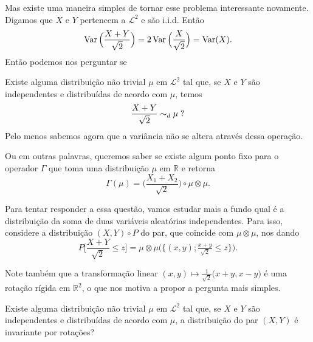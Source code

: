 Mas existe uma maneira simples de tornar esse problema interessante novamente.
Digamos que $X$ e $Y$ pertencem a $\mathcal{L}^2$ e são i.i.d.
Então
\begin{equation}
  \operatorname{Var}\Big(\frac{X + Y}{\sqrt{2}}\Big) = 2 \operatorname{Var}\Big( \frac X{\sqrt{2}} \Big) = \operatorname{Var}(X).
\end{equation}
Então podemos nos perguntar se

\begin{question}
  \label{q:ponto_fixo_soma}
  Existe alguma distribuição não trivial $\mu$ em $\mathcal{L}^2$ tal que, se $X$ e $Y$ são independentes e distribuídas de acordo com $\mu$, temos
  \begin{equation}
    \frac{X + Y}{\sqrt{2}} \sim_d \mu \; ?
  \end{equation}
  Pelo menos sabemos agora que a variância não se altera através dessa operação.
\end{question}

Ou em outras palavras, queremos saber se existe algum ponto fixo para o operador $\Gamma$ que toma uma distribuição $\mu$ em $\mathbb{R}$ e retorna
\begin{equation}
  \label{e:Gamma_operador}
  \Gamma(\mu) = \Big( \frac{X_1 + X_2}{\sqrt{2}} \Big) \circ \mu \otimes \mu.
\end{equation}


Para tentar responder a essa questão, vamos estudar mais a fundo qual é a distribuição da soma de duas variáveis aleatórias independentes.
Para isso, considere a distribuição $(X,Y) \circ P$ do par, que coincide com $\mu \otimes \mu$, nos dando
\begin{equation}
  P\Big[ \frac{X + Y}{\sqrt{2}} \leq z \Big] = \mu \otimes \mu \big( \big\{(x, y); \tfrac{x + y}{\sqrt{2}} \leq z \big\} \big).
\end{equation}

Note também que a transformação linear $(x,y) \mapsto \tfrac{1}{\sqrt{2}}\big(x + y, x - y\big)$ é uma rotação rígida em $\mathbb{R}^2$, o que nos motiva a propor a pergunta mais simples.

\begin{question}
  Existe alguma distribuição não trivial $\mu$ em $\mathcal{L}^2$ tal que, se $X$ e $Y$ são independentes e distribuídas de acordo com $\mu$, a distribuição do par $(X,Y)$ é invariante por rotações?
\end{question}

